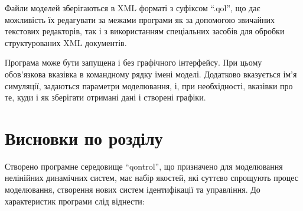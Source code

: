 Файли моделей зберігаються в XML форматі з суфіксом ``.qol'', що дає
можливість їх редагувати за межами програми як за допомогою
звичайних текстових редакторів, так і з використанням
спеціальних засобів для обробки структурованих XML документів.


Програма може бути запущена і без графічного інтерфейсу. При
цьому обов'язкова вказівка в командному рядку імені
моделі. Додатково вказується ім'я симуляції, задаються параметри
моделювання, і, при необхідності, вказівки про те, куди і як
зберігати отримані дані і створені графіки.



\section{Висновки по розділу \thechapter} %

Створено програмне середовище ``qontrol'', що призначено для
моделювання нелінійних динамічних систем, має набір якостей,
які суттєво спрощують процес моделювання, створення нових
систем ідентифікації та управління. До характеристик програми
слід віднести:

